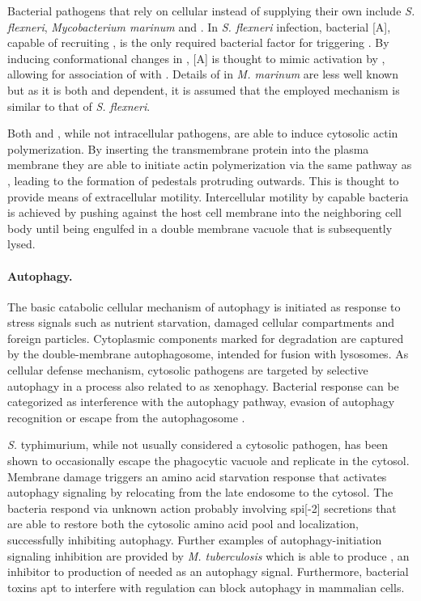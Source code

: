 Bacterial pathogens that rely on cellular  instead of supplying their own include \textit{S. flexneri}, \textit{Mycobacterium marinum}  and . In \textit{S. flexneri} infection, bacterial [A], capable of recruiting , is the only required bacterial factor for triggering . By inducing conformational changes in , [A] is thought to mimic activation by , allowing for association of  with . Details of  in \textit{M. marinum} are less well known but as it is both  and  dependent, it is assumed that the employed mechanism is similar to that of \textit{S. flexneri}.

Both  and , while not intracellular pathogens, are able to induce cytosolic actin polymerization. By inserting the transmembrane protein  into the plasma membrane they are able to initiate actin polymerization via the same pathway as , leading to the formation of pedestals protruding outwards. This is thought to provide means of extracellular motility. Intercellular motility by  capable bacteria is achieved by pushing against the host cell membrane into the neighboring cell body until being engulfed in a double membrane vacuole that is subsequently lysed.

\label{autophagy}
\paragraph{Autophagy.}
The basic catabolic cellular mechanism of autophagy is initiated as response to stress signals such as nutrient starvation, damaged cellular compartments and foreign particles. Cytoplasmic components marked for degradation are captured by the double-membrane autophagosome, intended for fusion with lysosomes. As cellular defense mechanism, cytosolic pathogens are targeted by selective autophagy in a process also related to as xenophagy. Bacterial response can be categorized as interference with the autophagy pathway, evasion of autophagy recognition or escape from the autophagosome \citep{Ham2011,Huang2014}.

\textit{S.} typhimurium, while not usually considered a cytosolic pathogen, has been shown to occasionally escape the phagocytic vacuole and replicate in the cytosol. Membrane damage triggers an amino acid starvation response that activates autophagy signaling by relocating  from the late endosome to the cytosol. The bacteria respond via unknown action probably involving \acrshort{spi}[-2]  secretions that are able to restore both the cytosolic amino acid pool and  localization, successfully inhibiting autophagy. Further examples of autophagy-initiation signaling inhibition are provided by \textit{M. tuberculosis} which is able to produce , an inhibitor to production of  needed as an autophagy signal. Furthermore, bacterial toxins apt to interfere with  regulation can block autophagy in mammalian cells.

